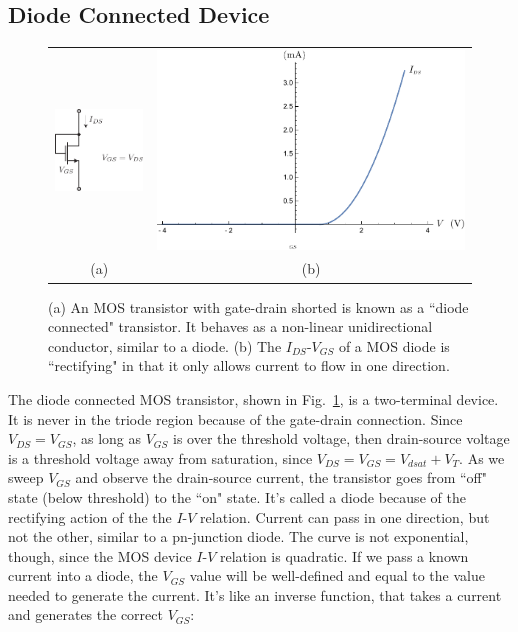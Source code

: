 \subsection{Diode Connected Device}
\begin{figure}[tb]
\centering
\begin{tabular}{cc}
\includegraphics[scale=1]{3mos_diode.pdf} &
\includegraphics[width=.5\columnwidth]{ivrect.pdf}\\
(a) & (b)\\
\end{tabular}
\caption{(a) An MOS transistor with gate-drain shorted is known as a ``diode connected" transistor.  It behaves as a non-linear unidirectional conductor, similar to a diode.  (b) The $I_{DS}$-$V_{GS}$ of a MOS diode is ``rectifying" in that it only allows current to flow in one direction.}
\label{fig:3mos_diode.pdf}
\end{figure}
The diode connected MOS transistor, shown in Fig.~\ref{fig:3mos_diode.pdf}, is a two-terminal device.  It is never in the triode region because of the gate-drain connection.  Since $V_{DS} = V_{GS}$, as long as $V_{GS}$ is over the threshold voltage, then drain-source voltage is a threshold voltage away from saturation, since $V_{DS} = V_{GS} = V_{dsat} + V_T$.  As we sweep $V_{GS}$ and observe the drain-source current, the transistor goes from ``off" state (below threshold) to the ``on" state.  It's called a diode because of the rectifying action of the the $I$-$V$ relation. Current can pass in one direction, but not the other, similar to a pn-junction diode.  The curve is not exponential, though, since the MOS device $I$-$V$ relation is quadratic.  If we pass a known current into a diode, the $V_{GS}$ value will be well-defined and equal to the value needed to generate the current. It's like an inverse function, that takes a current and generates the correct $V_{GS}$:
